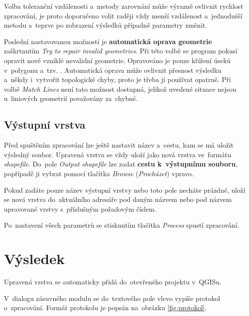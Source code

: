 Volba toleranční vzdálenosti a~metody zarovnání může výrazně ovlivnit rychlost 
zpracování, je proto doporučeno volit raději vždy menší vzdálenost a~jednodušší
metodu a~teprve po zobrazení výsledků případně parametry změnit.

Poslední nastavovanou možností je \textbf{automatická oprava geometrie}
 zaškrtnutím \textit{Try to repair invalid geometries}. Při této volbě se 
program pokusí opravit nově vzniklé nevalidní geometrie. Opravováno je pouze 
křížení úseků v~polygonu a~tzv. . Automa\-tická oprava  
může ovlivnit přesnost výsledku a~někdy i~vytvořit topologické chyby, proto 
je třeba ji používat opatrně. Při volbě \textit{Match Lines} není tato možnost
dostupná, jelikož uvedené situace nejsou u~liniových geometrií považovány
za~chybné.

\subsection{Výstupní vrstva}

Před spuštěním zpracování lze ještě nastavit název a~cestu, kam se má uložit
vý\-sledný soubor. Upravená vrstva se vždy uloží jako nová vrstva ve~formátu 
\textit{shapefile}. Do~pole \textit{Output shapefile} lze zadat \textbf{cestu 
k~výstupnímu souboru}, popřípadě ji vybrat pomocí tlačítka \textit{Browse} 
(\textit{Procházet}) vpravo. 

Pokud zadáte pouze název výstupní vrstvy nebo toto pole necháte prázdné, 
uloží se nová vrstva do~aktuálního adresáře pod daným názvem nebo pod názvem
upravované vrstvy s~příslušným pořadovým číslem. 

Po~nastavení všech parametrů se stisknutím tlačítka \textit{Process} 
spustí zpracování. 

\section{Výsledek}
\label{prirucka-vysledek}

Upravená vrstva se automaticky přidá do~otevřeného projektu v~QGISu.

V~dialogu zásuvného modulu se do~textového pole vlevo vypíše protokol o~zpracování.
Formát protokolu je popsán na~obrázku \ref{fig:protokol}.  


